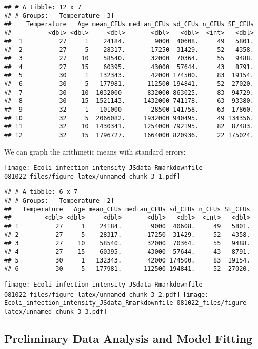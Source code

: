 \documentclass[
]{article}
\begin{document}
\begin{verbatim}
## # A tibble: 12 x 7
## # Groups:   Temperature [3]
##    Temperature   Age mean_CFUs median_CFUs sd_CFUs n_CFUs SE_CFUs
##          <dbl> <dbl>     <dbl>       <dbl>   <dbl>  <int>   <dbl>
##  1          27     1    24184.        9000  40608.     49   5801.
##  2          27     5    28317.       17250  31429.     52   4358.
##  3          27    10    58540.       32000  70364.     55   9488.
##  4          27    15    60395.       43000  57644.     43   8791.
##  5          30     1   132343.       42000 174500.     83  19154.
##  6          30     5   177981.      112500 194841.     52  27020.
##  7          30    10  1032000       832000 863025.     83  94729.
##  8          30    15  1521143.     1432000 741178.     63  93380.
##  9          32     1   101000        28500 141758.     63  17860.
## 10          32     5  2066082.     1932000 940495.     49 134356.
## 11          32    10  1430341.     1254000 792195.     82  87483.
## 12          32    15  1796727.     1664000 820936.     22 175024.
\end{verbatim}

We can graph the arithmetic means with standard errors:

\texttt{[image: Ecoli\_infection\_intensity\_JSdata\_Rmarkdownfile-081022\_files/figure-latex/unnamed-chunk-3-1.pdf]}

\begin{verbatim}
## # A tibble: 6 x 7
## # Groups:   Temperature [2]
##   Temperature   Age mean_CFUs median_CFUs sd_CFUs n_CFUs SE_CFUs
##         <dbl> <dbl>     <dbl>       <dbl>   <dbl>  <int>   <dbl>
## 1          27     1    24184.        9000  40608.     49   5801.
## 2          27     5    28317.       17250  31429.     52   4358.
## 3          27    10    58540.       32000  70364.     55   9488.
## 4          27    15    60395.       43000  57644.     43   8791.
## 5          30     1   132343.       42000 174500.     83  19154.
## 6          30     5   177981.      112500 194841.     52  27020.
\end{verbatim}

\texttt{[image: Ecoli\_infection\_intensity\_JSdata\_Rmarkdownfile-081022\_files/figure-latex/unnamed-chunk-3-2.pdf]}
\texttt{[image: Ecoli\_infection\_intensity\_JSdata\_Rmarkdownfile-081022\_files/figure-latex/unnamed-chunk-3-3.pdf]}

\hypertarget{preliminary-data-analysis-and-model-fitting}{%
\subsection{Preliminary Data Analysis and Model
Fitting}\label{preliminary-data-analysis-and-model-fitting}}
\end{document}

